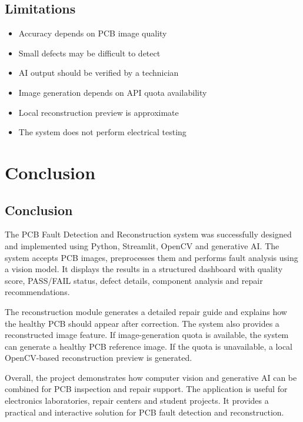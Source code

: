 \documentclass[12pt,a4paper]{report}
\begin{document}
\section{Limitations}

\begin{itemize}

\item Accuracy depends on PCB image quality
\item Small defects may be difficult to detect
\item AI output should be verified by a technician
\item Image generation depends on API quota availability
\item Local reconstruction preview is approximate
\item The system does not perform electrical testing

\end{itemize}


\chapter{Conclusion}

\section{Conclusion}

The PCB Fault Detection and Reconstruction system was successfully designed and implemented using Python, Streamlit, OpenCV and generative AI. The system accepts PCB images, preprocesses them and performs fault analysis using a vision model. It displays the results in a structured dashboard with quality score, PASS/FAIL status, defect details, component analysis and repair recommendations.

The reconstruction module generates a detailed repair guide and explains how the healthy PCB should appear after correction. The system also provides a reconstructed image feature. If image-generation quota is available, the system can generate a healthy PCB reference image. If the quota is unavailable, a local OpenCV-based reconstruction preview is generated.

Overall, the project demonstrates how computer vision and generative AI can be combined for PCB inspection and repair support. The application is useful for electronics laboratories, repair centers and student projects. It provides a practical and interactive solution for PCB fault detection and reconstruction.
\end{document}
